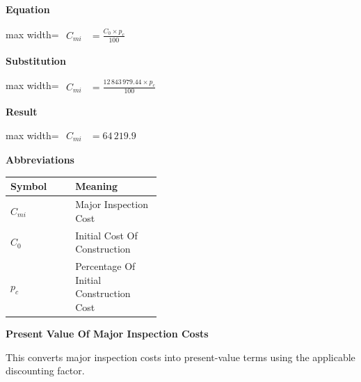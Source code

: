 \documentclass{article}
\begin{document}
\vspace{0.4em}
\textbf{Equation}\par\vspace{-0.35em}
\begin{center}
\begin{adjustbox}{max width=\linewidth}
$\displaystyle\begin{aligned}
C_{mi} &= \frac{C_0 \times p_c}{100}
\end{aligned}$
\end{adjustbox}
\end{center}
\vspace{0.4em}
\textbf{Substitution}\par\vspace{-0.35em}
\begin{center}
\begin{adjustbox}{max width=\linewidth}
$\displaystyle\begin{aligned}
C_{mi} &= \frac{12\,843\,979.44 \times p_c}{100}
\end{aligned}$
\end{adjustbox}
\end{center}
\vspace{0.4em}
\textbf{Result}\par\vspace{-0.35em}
\begin{center}
\begin{adjustbox}{max width=\linewidth}
$\displaystyle\begin{aligned}
C_{mi} &= 64\,219.9
\end{aligned}$
\end{adjustbox}
\end{center}
\vspace{0.4em}
\textbf{Abbreviations}\par\vspace{-0.35em}
\begin{tabularx}{\linewidth}{>{\raggedright\arraybackslash}p{0.43\linewidth} >{\raggedright\arraybackslash}X}
\toprule
Symbol & Meaning \\
\midrule
$C_{mi}$ & Major Inspection Cost \\
$C_0$ & Initial Cost Of Construction \\
$p_c$ & Percentage Of Initial Construction Cost \\
\bottomrule
\end{tabularx}
\vspace{0.6em}
\vspace{0.4em}
\textbf{Present Value Of Major Inspection Costs}\par\vspace{-0.35em}
This converts major inspection costs into present-value terms using the applicable discounting factor.
\end{document}
